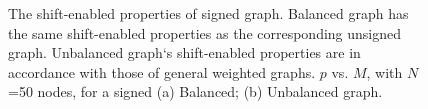\documentclass[journal]{IEEEtran}
\begin{document}
\begin{figure}[htb]
	\centering
	\caption{The shift-enabled properties of signed  graph.
	Balanced graph has the same shift-enabled properties as the corresponding unsigned  graph.
	Unbalanced graph`s shift-enabled properties are in accordance with those of general weighted  graphs. $p$ vs. $M$, with $N$=50 nodes, for a signed
		 (a) Balanced; (b) Unbalanced  graph.}
	\label{fig:balance_unbalance}
\end{figure}


\end{document}
